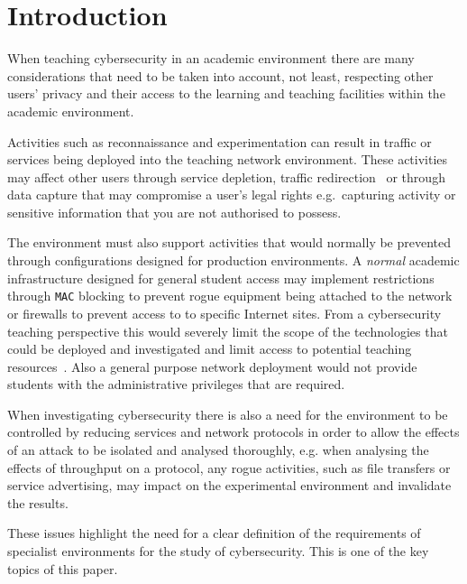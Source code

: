 \documentclass[10pt,journal]{IEEEtran}
\begin{document}
\section{Introduction}\label{intro}
When teaching cybersecurity in an academic environment there are many
considerations that need to be taken into account, not least, respecting other
users' privacy and their access to the learning and teaching facilities within
the academic environment.

Activities such as reconnaissance and experimentation can result in traffic or
services being deployed into the teaching network environment. These activities
may affect other users through service depletion, traffic
redirection~\cite{ACGO:06,LR:06} or through data capture that may compromise a
user's legal rights e.g.\ capturing activity or sensitive information that you
are not authorised to possess.

The environment must also support activities that would normally be prevented
through configurations designed for production environments. A \emph{normal}
academic infrastructure designed for general student access may implement
restrictions through \texttt{MAC} blocking to prevent rogue equipment being
attached to the network or firewalls to prevent access to to specific Internet
sites. From a cybersecurity teaching perspective this would severely limit the
scope of the technologies that could be deployed and investigated and limit
access to potential teaching resources~\cite{ACGO:06,YYLCHJ:04}. Also a general
purpose network deployment would not provide students with the administrative
privileges that are required.

When investigating cybersecurity there is also a need for the environment to be
controlled by reducing services and network protocols in order to allow the
effects of an attack to be isolated and analysed thoroughly, e.g. when
analysing the effects of throughput on a protocol, any rogue activities, such
as file transfers or service advertising, may impact on the experimental
environment and invalidate the results.

These issues highlight the need for a clear definition of the requirements of
specialist environments for the study of cybersecurity. This is one of the
key topics of this paper.
\end{document}
